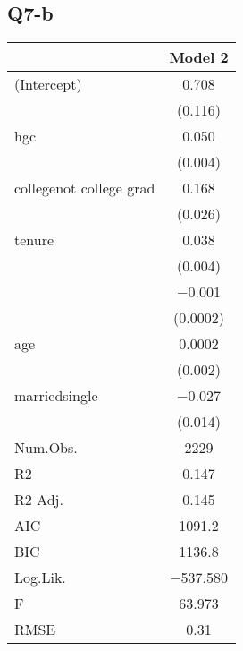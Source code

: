 \documentclass{article}
\begin{document}
\subsection*{Q7-b}
\begin{table}[h]
\centering
\begin{tabular}[t]{lc}
\hline
  & Model 2\\
\hline
(Intercept) & \num{0.708}\\
 & (\num{0.116})\\
hgc & \num{0.050}\\
 & \vphantom{1} (\num{0.004})\\
collegenot college grad & \num{0.168}\\
 & (\num{0.026})\\
tenure & \num{0.038}\\
 & (\num{0.004})\\
 & \num{-0.001}\\
 & (\num{0.0002})\\
age & \num{0.0002}\\
 & (\num{0.002})\\
marriedsingle & \num{-0.027}\\
 & (\num{0.014})\\
\hline
Num.Obs. & \num{2229}\\
R2 & \num{0.147}\\
R2 Adj. & \num{0.145}\\
AIC & \num{1091.2}\\
BIC & \num{1136.8}\\
Log.Lik. & \num{-537.580}\\
F & \num{63.973}\\
RMSE & \num{0.31}\\
\hline
\end{tabular}
\end{table}
\end{document}
